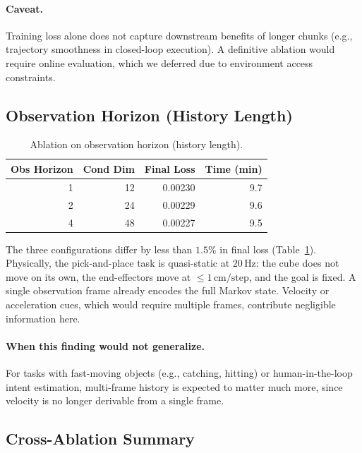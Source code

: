 \documentclass[11pt]{article}
\begin{document}
\paragraph{Caveat.} Training loss alone does not capture downstream
benefits of longer chunks (e.g., trajectory smoothness in closed-loop
execution). A definitive ablation would require online evaluation,
which we deferred due to environment access constraints.

\subsection{Observation Horizon (History Length)}

\begin{table}[H]
\centering
\small
\begin{tabular}{rrrr}
\toprule
\textbf{Obs Horizon} & \textbf{Cond Dim} & \textbf{Final Loss} & \textbf{Time (min)} \\
\midrule
1 & 12 & 0.00230 & 9.7 \\
2 & 24 & 0.00229 & 9.6 \\
4 & 48 & 0.00227 & 9.5 \\
\bottomrule
\end{tabular}
\caption{Ablation on observation horizon (history length).}
\label{tab:obs_horizon}
\end{table}

The three configurations differ by less than $1.5\%$ in final loss
(Table~\ref{tab:obs_horizon}). Physically, the pick-and-place task is
quasi-static at $20\,\text{Hz}$: the cube does not move on its own,
the end-effectors move at $\le 1\,\text{cm/step}$, and the goal is
fixed. A single observation frame already encodes the full Markov
state. Velocity or acceleration cues, which would require multiple
frames, contribute negligible information here.

\paragraph{When this finding would not generalize.} For tasks with
fast-moving objects (e.g., catching, hitting) or human-in-the-loop
intent estimation, multi-frame history is expected to matter much
more, since velocity is no longer derivable from a single frame.

\subsection{Cross-Ablation Summary}
\end{document}
